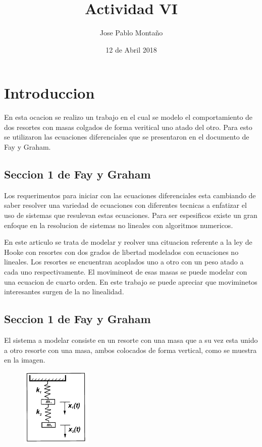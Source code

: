 \documentclass[a4paper]{article}
\title{Actividad VI}
\author{Jose Pablo Montaño}
\date{12 de Abril 2018}
\begin{document}
\maketitle


\section{Introduccion}

En esta ocacion se realizo un trabajo en el cual se modelo el comportamiento de dos resortes con masas colgados de forma veritical uno atado del otro. Para esto se utilizaron las ecuaciones diferenciales que se presentaron en el documento de Fay y Graham.

\subsection{Seccion 1 de Fay y Graham}


Los requerimentos para iniciar con las ecuaciones diferenciales esta cambiando de saber resolver una variedad de ecuaciones con diferentes tecnicas a enfatizar el uso de sistemas que resulevan estas ecuaciones. Para ser espesificos existe un gran enfoque en la resolucion de sistemas no lineales con algoritmos numericos.
\linebreak

En este articulo se trata de modelar y reolver una cituacion referente a la ley de Hooke con resortes con dos grados de libertad modelados con ecuaciones no lineales. Los resortes se encuentran acoplados uno a otro con un peso atado a cada uno respectivamente. El movimineot de esas masas se puede modelar con una ecuacion de cuarto orden. En este trabajo se puede apreciar que moviminetos interesantes surgen de la no linealidad. 


\subsection{Seccion 1 de Fay y Graham}

El sistema a modelar consiste en un resorte con una masa que a su vez esta unido a otro resorte con una masa, ambos colocados de forma vertical, como se muestra en la imagen.

\begin{figure}[ht!]
\centering
\includegraphics[width=0.3\textwidth]{Resorte.png}
\end{figure}
\end{document}
